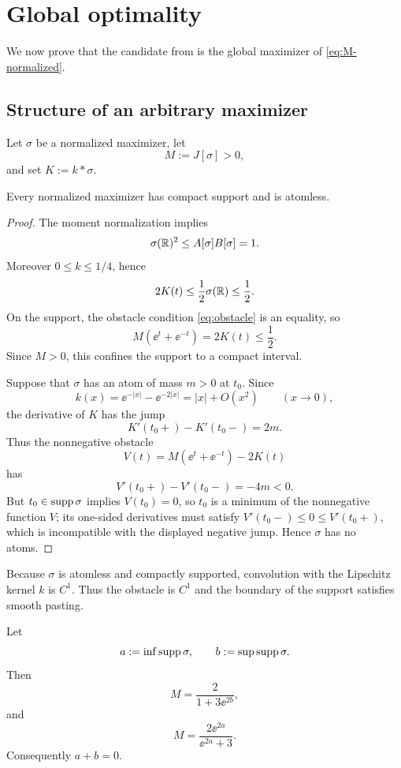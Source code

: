 \section{Global optimality}\label{sec:global}

We now prove that the candidate from  is the global maximizer of \eqref{eq:M-normalized}.

\subsection{Structure of an arbitrary maximizer}

Let $\sigma$ be a normalized maximizer, let
\[
 M:=J[\sigma]>0,
\]
and set $K:=k*\sigma$.

\begin{lemma}
Every normalized maximizer has compact support and is atomless.
\end{lemma}

\begin{proof}
The moment normalization implies
\[
 \sigma(\mathbb{R})^2\le A[\sigma]B[\sigma]=1.
\]
Moreover $0\le k\le1/4$, hence
\[
 2K(t)\le\frac12\sigma(\mathbb{R})\le\frac12.
\]
On the support, the obstacle condition \eqref{eq:obstacle} is an equality, so
\[
 M(\ee^t+\ee^{-t})=2K(t)\le\frac12.
\]
Since $M>0$, this confines the support to a compact interval.

Suppose that $\sigma$ has an atom of mass $m>0$ at $t_0$.  Since
\[
 k(x)=\ee^{-|x|}-\ee^{-2|x|}=|x|+O(x^2)
 \qquad (x\to0),
\]
the derivative of $K$ has the jump
\[
 K'(t_0+)-K'(t_0-)=2m.
\]
Thus the nonnegative obstacle
\[
 V(t)=M(\ee^t+\ee^{-t})-2K(t)
\]
has
\[
 V'(t_0+)-V'(t_0-)=-4m<0.
\]
But $t_0\in\operatorname{supp}\sigma$ implies $V(t_0)=0$, so $t_0$ is a minimum of the nonnegative function $V$; its one-sided derivatives must satisfy $V'(t_0-)\le0\le V'(t_0+)$, which is incompatible with the displayed negative jump.  Hence $\sigma$ has no atoms.
\end{proof}

Because $\sigma$ is atomless and compactly supported, convolution with the Lipschitz kernel $k$ is $C^1$.  Thus the obstacle is $C^1$ and the boundary of the support satisfies smooth pasting.

\begin{lemma}\label{lem:endpoints}
Let
\[
 a:=\inf\operatorname{supp}\sigma,
 \qquad b:=\sup\operatorname{supp}\sigma.
\]
Then
\begin{equation}\label{eq:M-right}
 M=\frac{2}{1+3\ee^{2b}},
\end{equation}
and
\begin{equation}\label{eq:M-left}
 M=\frac{2\ee^{2a}}{\ee^{2a}+3}.
\end{equation}
Consequently $a+b=0$.
\end{lemma}

